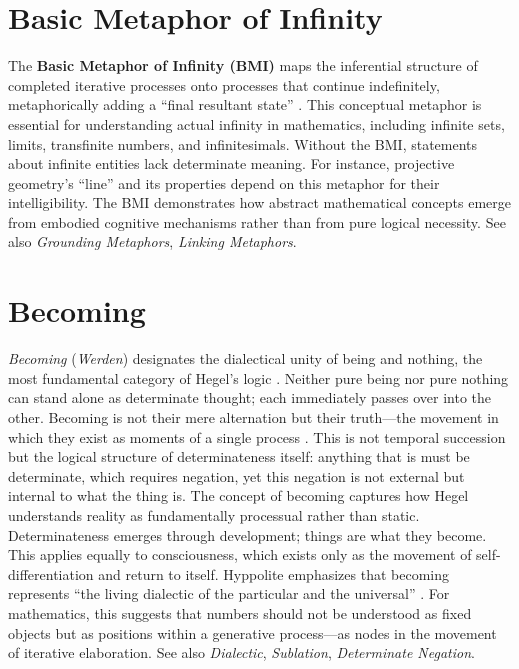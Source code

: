 \documentclass{book}
\begin{document}
\section{Basic Metaphor of Infinity}

The \textbf{Basic Metaphor of Infinity (BMI)} maps the inferential structure of completed iterative processes onto processes that continue indefinitely, metaphorically adding a ``final resultant state'' \parencite{Lakoff2000}. This conceptual metaphor is essential for understanding actual infinity in mathematics, including infinite sets, limits, transfinite numbers, and infinitesimals. Without the BMI, statements about infinite entities lack determinate meaning. For instance, projective geometry's ``line'' and its properties depend on this metaphor for their intelligibility. The BMI demonstrates how abstract mathematical concepts emerge from embodied cognitive mechanisms rather than from pure logical necessity. See also \textit{Grounding Metaphors}, \textit{Linking Metaphors}.

\section{Becoming}

\textit{Becoming} (\textit{Werden}) designates the dialectical unity of being and nothing, the most fundamental category of Hegel's logic \parencite{hegel_georg_2010}. Neither pure being nor pure nothing can stand alone as determinate thought; each immediately passes over into the other. Becoming is not their mere alternation but their truth---the movement in which they exist as moments of a single process \parencite{hegel_georg_2010}. This is not temporal succession but the logical structure of determinateness itself: anything that is must be determinate, which requires negation, yet this negation is not external but internal to what the thing is. The concept of becoming captures how Hegel understands reality as fundamentally processual rather than static. Determinateness emerges through development; things are what they become. This applies equally to consciousness, which exists only as the movement of self-differentiation and return to itself. Hyppolite emphasizes that becoming represents ``the living dialectic of the particular and the universal'' \parencite{Hyppolite1974}. For mathematics, this suggests that numbers should not be understood as fixed objects but as positions within a generative process---as nodes in the movement of iterative elaboration. See also \textit{Dialectic}, \textit{Sublation}, \textit{Determinate Negation}.
\end{document}
